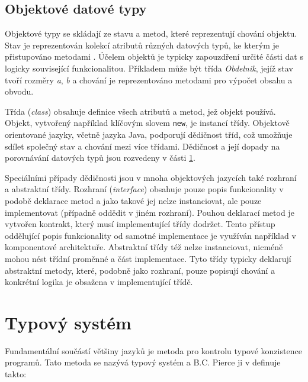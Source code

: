 \documentclass[czech,DP]{thesiskiv}
\begin{document}
\subsection{Objektové datové typy}

Objektové typy se skládají ze stavu a metod, které reprezentují chování objektu. Stav je reprezentován kolekcí atributů různých datových typů, ke kterým je přistupováno metodami \cite{oracleJava}. Účelem objektů je typicky zapouzdření určité části dat s logicky související funkcionalitou. Příkladem může být třída \textit{Obdelnik}, jejíž stav tvoří rozměry \textit{a}, \textit{b} a chování je reprezentováno metodami pro výpočet obsahu a obvodu.

Třída (\textit{class}) obsahuje definice všech atributů a metod, jež objekt používá. Objekt, vytvořený například klíčovým slovem \verb|new|, je instancí třídy. Objektově orientované jazyky, včetně jazyka Java, podporují dědičnost tříd, což umožňuje sdílet společný stav a chování mezi více třídami. Dědičnost a její dopady na porovnávání datových typů jsou rozvedeny v části \ref{sec:type-system}. 

Speciálními případy dědičnosti jsou v mnoha objektových jazycích také rozhraní a abstraktní třídy. Rozhraní (\textit{interface}) obsahuje pouze popis funkcionality v podobě deklarace metod a jako takové jej nelze instanciovat, ale pouze implementovat (případně oddědit v jiném rozhraní). Pouhou deklarací metod je vytvořen kontrakt, který musí implementující třídy dodržet. Tento přístup oddělující popis funkcionality od samotné implementace je využíván například v komponentové architektuře. Abstraktní třídy též nelze instanciovat, nicméně mohou nést třídní proměnné a část implementace. Tyto třídy typicky deklarují abstraktní metody, které, podobně jako rozhraní, pouze popisují chování a konkrétní logika je obsažena v implementující třídě. 

 
\section{Typový systém}
\label{sec:type-system}

Fundamentální součástí většiny jazyků je metoda pro kontrolu typové konzistence programů. Tato metoda se nazývá typový systém a B.C. Pierce ji v \cite{pierce2002} definuje takto:

\end{document}
